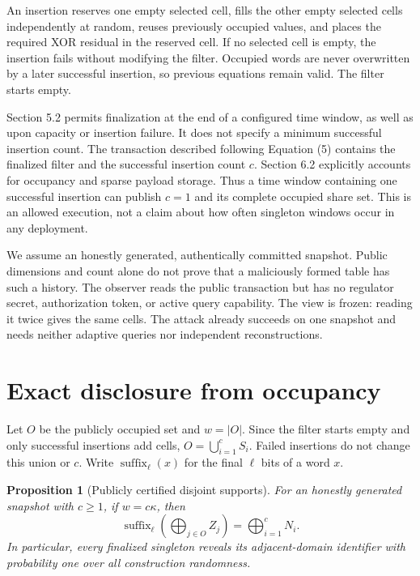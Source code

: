 \documentclass[11pt]{article}
\newtheorem{proposition}{Proposition}
\newcommand{\suffix}{\operatorname{suffix}}
\begin{document}
An insertion reserves one empty selected cell, fills the other empty selected
cells independently at random, reuses previously occupied values, and places
the required XOR residual in the reserved cell. If no selected cell is empty,
the insertion fails without modifying the filter. Occupied words are never
overwritten by a later successful insertion, so previous equations remain
valid. The filter starts empty.

Section 5.2 permits finalization at the end of a configured time window, as
well as upon capacity or insertion failure. It does not specify a minimum
successful insertion count. The transaction described following Equation (5)
contains the finalized filter and the successful insertion count $c$.
Section 6.2 explicitly accounts for occupancy and sparse payload storage.
Thus a time window containing one successful insertion can publish $c=1$ and
its complete occupied share set. This is an allowed execution, not a claim
about how often singleton windows occur in any deployment.

We assume an honestly generated, authentically committed snapshot. Public
dimensions and count alone do not prove that a maliciously formed table has
such a history. The observer reads the public transaction but has no regulator
secret, authorization token, or active query capability. The view is frozen:
reading it twice gives the same cells. The attack already succeeds on one
snapshot and needs neither adaptive queries nor independent reconstructions.

\section{Exact disclosure from occupancy}

Let $O$ be the publicly occupied set and $w=|O|$. Since the filter starts empty
and only successful insertions add cells,
$O=\bigcup_{i=1}^{c}S_i$. Failed insertions do not change this union or $c$.
Write $\suffix_\ell(x)$ for the final $\ell$ bits of a word $x$.

\begin{proposition}[Publicly certified disjoint supports]
\label{prop:disjoint}
For an honestly generated snapshot with $c\geq1$, if $w=c\kappa$, then
\begin{equation}
 \suffix_\ell\!\left(\bigoplus_{j\in O}Z_j\right)
       =\bigoplus_{i=1}^{c}N_i.
 \label{eq:leak}
\end{equation}
In particular, every finalized singleton reveals its adjacent-domain
identifier with probability one over all construction randomness.
\end{proposition}
\end{document}
